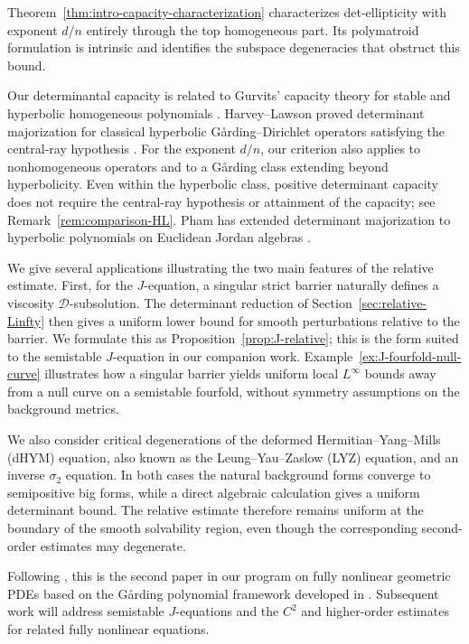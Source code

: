\documentclass[oneside,english,letterpaper]{amsart}
\numberwithin{equation}{section}
\theoremstyle{plain}
\theoremstyle{definition}
\theoremstyle{remark}
\begin{document}
Theorem~\ref{thm:intro-capacity-characterization} characterizes
det-ellipticity with exponent $d/n$ entirely through the top homogeneous
part. Its polymatroid formulation is intrinsic and identifies the
subspace degeneracies that obstruct this bound. 

Our determinantal capacity is related to Gurvits' capacity theory
for stable and hyperbolic homogeneous polynomials \cite{MR2411443}.
Harvey--Lawson proved determinant majorization for classical
hyperbolic G{\aa}rding--Dirichlet operators satisfying the central-ray
hypothesis \cite{HarveyLawsonMajorization,MR4589710,MR4965192}.
For the exponent $d/n$, our criterion also applies to nonhomogeneous
operators and to a G{\aa}rding class extending beyond hyperbolicity.
Even within the hyperbolic class, positive determinant capacity does
not require the central-ray hypothesis or attainment of the capacity;
see Remark~\ref{rem:comparison-HL}. Pham has extended determinant
majorization to hyperbolic polynomials on Euclidean Jordan algebras
\cite{Pham26}.

We give several applications illustrating the two main features of the
relative estimate.  First, for the $J$-equation, a singular strict barrier
naturally defines a viscosity $\mathcal D$-subsolution.  The determinant
reduction of Section~\ref{sec:relative-Linfty} then gives a uniform lower bound for smooth
perturbations relative to the barrier.  We formulate this as
Proposition~\ref{prop:J-relative}; this is the form suited to the semistable $J$-equation in our companion work.  Example~\ref{ex:J-fourfold-null-curve} illustrates how a singular
barrier yields uniform local $L^\infty$ bounds away from a null
curve on a semistable fourfold, without symmetry assumptions
on the background metrics.

We also consider critical degenerations of the deformed Hermitian--Yang--Mills (dHYM) equation,
also known as the Leung--Yau--Zaslow (LYZ) equation,
and an inverse $\sigma_2$ equation.  In both cases
the natural background forms converge to semipositive big forms, while
a direct algebraic calculation gives a uniform determinant bound.
The relative estimate therefore remains uniform at the boundary of
the smooth solvability region, even though the corresponding
second-order estimates may degenerate.

Following \cite{fang2026liouvillerigidityrealcomplex}, this is the second paper in our program
on fully nonlinear geometric PDEs based on the G{\aa}rding polynomial
framework developed in \cite{Fang-MaGard,fang2026idealgaardingpolynomials}.
Subsequent work will address semistable $J$-equations and the
$C^2$ and higher-order estimates for related fully nonlinear equations.
\end{document}
